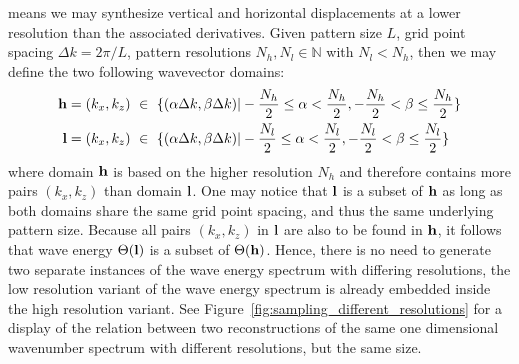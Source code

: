 means we may synthesize vertical and horizontal displacements at a lower
resolution than the associated derivatives.
%
%
Given pattern size $L$, grid point spacing $\Delta k = 2\pi/L$, pattern
resolutions $N_h,N_l \in \mathbb{N}$ with $N_l < N_h$, then we may define the
two following wavevector domains:
%
\begin{align}
\mathbf{h} = (k_x,k_z)~&\in~\{(\alpha\Delta k,\beta\Delta k)|-\frac{N_h}{2}\leq\alpha<\frac{N_h}{2},-\frac{N_h}{2}<\beta\leq\frac{N_h}{2}\}\\
\mathbf{l} = (k_x,k_z)~&\in~\{(\alpha\Delta k,\beta\Delta k)|-\frac{N_l}{2}\leq\alpha<\frac{N_l}{2},-\frac{N_l}{2}<\beta\leq\frac{N_l}{2}\}
\end{align}
where \wavevector domain $\mathbf{h}$ is based on the higher resolution $N_h$ and therefore contains
more pairs $(k_x, k_z)$ than \wavevector domain $\mathbf{l}$. One may notice that $\mathbf{l}$ is a
subset of $\mathbf{h}$ as long as both \wavevector domains share the same grid point
spacing, and thus the same underlying pattern size. Because all pairs $(k_x, k_z)$ in $\mathbf{l}$ are also to be found
in $\mathbf{h}$, it follows that wave energy $\Theta(\mathbf{l})$ is a subset of
$\Theta(\mathbf{h})$. Hence, there is no need to generate two separate instances
of the wave energy spectrum with differing resolutions,
the low resolution variant of the wave energy spectrum is already embedded inside the
high resolution variant. See Figure~\ref{fig:sampling_different_resolutions} for
a display of the relation between two reconstructions of the same one
dimensional wavenumber spectrum with different resolutions, but the same size.
%
%
